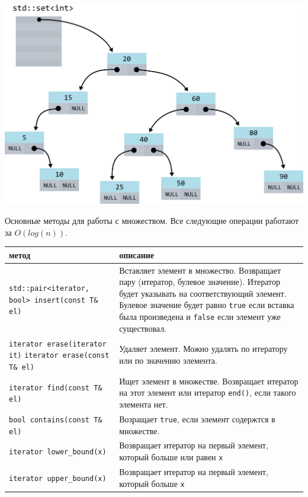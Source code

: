 \documentclass{article}
\begin{document}
\begin{center}
\includegraphics[scale=1]{../images/set_internals.png}
\end{center}

Основные методы для работы с множеством. Все следующие операции работают за $O(log(n))$.

\bgroup
\def\arraystretch{2}%
\begin{tabular}{ p{5cm} | p{12cm} }
метод & описание 
\\ \hline

\texttt{std::pair<iterator, bool> \newline insert(const T\& el)}
& Вставляет элемент в множество. \newline
Возвращает пару (итератор, булевое значение). Итератор будет указывать на соответствующий элемент.
Булевое значение будет равно \texttt{true} если вставка была произведена и \texttt{false} если
элемент уже существовал.
\\ \hline

\texttt{iterator erase(iterator it)}  \newline 
\texttt{iterator erase(const T\& el)}
& Удаляет элемент. Можно удалять по итератору или по значению элемента.
\\ \hline

\texttt{iterator find(const T\& el)} & Ищет элемент в множестве.\newline
Возвращает итератор на этот элемент или итератор \texttt{end()}, если такого элемента нет.
\\ \hline

\texttt{bool contains(const T\& el)}  & Возращает \texttt{true}, если элемент содержтся в множестве.
\\ \hline

\texttt{iterator lower\_bound(x)}  & Возвращает итератор на первый элемент, который больше или равен \texttt{x}
\\ \hline
\texttt{iterator upper\_bound(x)}  & Возвращает итератор на первый элемент, который больше \texttt{x} \newline
\\
\end{tabular}
\egroup
\end{document}
